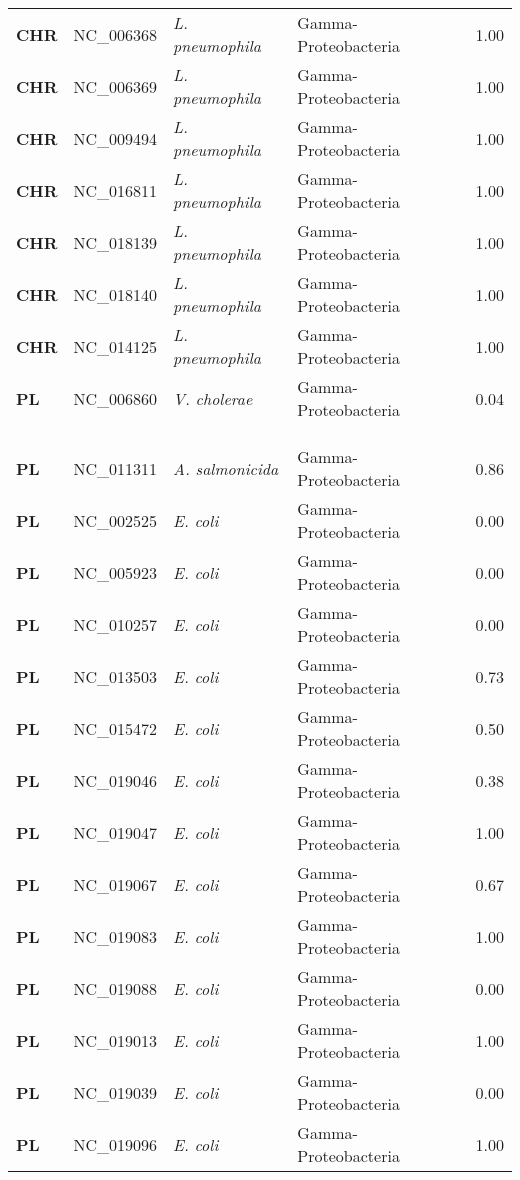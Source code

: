 \begin{adjustwidth}{-3cm}{2cm}
{\begin{supertabular}{>{\bfseries}l|p{0.1\textwidth}p{0.14\textwidth}l|l}
CHR & NC\_006368 & \textit{L. pneumophila} & Gamma-Proteobacteria & 1.00\\
CHR & NC\_006369 & \textit{L. pneumophila} & Gamma-Proteobacteria & 1.00\\
CHR & NC\_009494 & \textit{L. pneumophila} & Gamma-Proteobacteria & 1.00\\
CHR & NC\_016811 & \textit{L. pneumophila} & Gamma-Proteobacteria & 1.00\\
CHR & NC\_018139 & \textit{L. pneumophila} & Gamma-Proteobacteria & 1.00\\
CHR & NC\_018140 & \textit{L. pneumophila} & Gamma-Proteobacteria & 1.00\\
CHR & NC\_014125 & \textit{L. pneumophila} & Gamma-Proteobacteria & 1.00\\
PL & NC\_006860 & \textit{V. cholerae} & Gamma-Proteobacteria & 0.04\\
\\
\\
\hline\\
PL & NC\_011311 & \textit{A. salmonicida} & Gamma-Proteobacteria & 0.86\\
PL & NC\_002525 & \textit{E. coli} & Gamma-Proteobacteria & 0.00\\
PL & NC\_005923 & \textit{E. coli} & Gamma-Proteobacteria & 0.00\\
PL & NC\_010257 & \textit{E. coli} & Gamma-Proteobacteria & 0.00\\
PL & NC\_013503 & \textit{E. coli} & Gamma-Proteobacteria & 0.73\\
PL & NC\_015472 & \textit{E. coli} & Gamma-Proteobacteria & 0.50\\
PL & NC\_019046 & \textit{E. coli} & Gamma-Proteobacteria & 0.38\\
PL & NC\_019047 & \textit{E. coli} & Gamma-Proteobacteria & 1.00\\
PL & NC\_019067 & \textit{E. coli} & Gamma-Proteobacteria & 0.67\\
PL & NC\_019083 & \textit{E. coli} & Gamma-Proteobacteria & 1.00\\
PL & NC\_019088 & \textit{E. coli} & Gamma-Proteobacteria & 0.00\\
PL & NC\_019013 & \textit{E. coli} & Gamma-Proteobacteria & 1.00\\
PL & NC\_019039 & \textit{E. coli} & Gamma-Proteobacteria & 0.00\\
PL & NC\_019096 & \textit{E. coli} & Gamma-Proteobacteria & 1.00\\

\end{supertabular}}
\end{adjustwidth}
